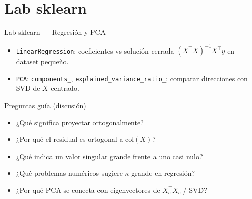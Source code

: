 \section[Lab sklearn]{Lab sklearn\label{sec:lab-sklearn-w07}}

\begin{frame}{Lab sklearn — Regresión y PCA}
\begin{itemize}\small
  \item \texttt{LinearRegression}: coeficientes vs solución cerrada \((X^\top X)^{-1}X^\top y\) en dataset pequeño.
  \item \texttt{PCA}: \texttt{components\_}, \texttt{explained\_variance\_ratio\_}; comparar direcciones con SVD de \(X\) centrado.
\end{itemize}
\end{frame}

\begin{frame}{Preguntas guía (discusión)}
\begin{itemize}\small
  \item ¿Qué significa proyectar ortogonalmente?
  \item ¿Por qué el residual es ortogonal a \(\mathrm{col}(X)\)?
  \item ¿Qué indica un valor singular grande frente a uno casi nulo?
  \item ¿Qué problemas numéricos sugiere \(\kappa\) grande en regresión?
  \item ¿Por qué PCA se conecta con eigenvectores de \(X_c^\top X_c\) / SVD?
\end{itemize}
\end{frame}
